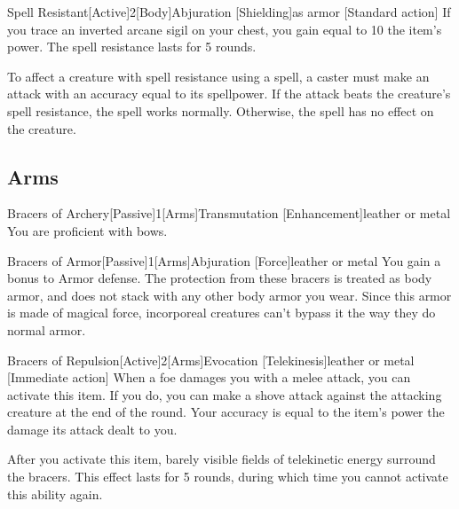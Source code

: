         \begin{magicitemdef}{Spell Resistant}[Active]{2}[Body]{Abjuration [Shielding]}{as armor}
            [Standard action] If you trace an inverted arcane sigil on your chest, you gain  equal to 10 \add the item's power.
            The spell resistance lasts for 5 rounds.

            To affect a creature with spell resistance using a spell, a caster must make an attack with an accuracy equal to its spellpower.
            If the attack beats the creature's spell resistance, the spell works normally.
            Otherwise, the spell has no effect on the creature.
        \end{magicitemdef}

    \subsection{Arms}

        \begin{magicitemdef}{Bracers of Archery}[Passive]{1}[Arms]{Transmutation [Enhancement]}{leather or metal}
             You are proficient with bows.
        \end{magicitemdef}

        \begin{magicitemdef}{Bracers of Armor}[Passive]{1}[Arms]{Abjuration [Force]}{leather or metal}
             You gain a  bonus to Armor defense.
            The protection from these bracers is treated as body armor, and does not stack with any other body armor you wear.
            Since this armor is made of magical force, incorporeal creatures can't bypass it the way they do normal armor.
        \end{magicitemdef}

        \begin{magicitemdef}{Bracers of Repulsion}[Active]{2}[Arms]{Evocation [Telekinesis]}{leather or metal}
            [Immediate action] When a foe damages you with a melee attack, you can activate this item.
            If you do, you can make a shove attack against the attacking creature at the end of the round.
            Your accuracy is equal to the item's power \add the damage its attack dealt to you.

            After you activate this item, barely visible fields of telekinetic energy surround the bracers.
            This effect lasts for 5 rounds, during which time you cannot activate this ability again.
        \end{magicitemdef}

